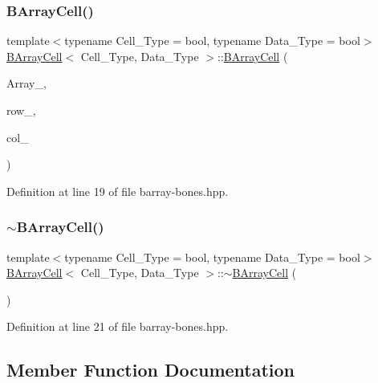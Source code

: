 \subsubsection{\texorpdfstring{B\+Array\+Cell()}{BArrayCell()}}
{\footnotesize\ttfamily template$<$typename Cell\+\_\+\+Type = bool, typename Data\+\_\+\+Type = bool$>$ \\
\hyperlink{class_b_array_cell}{B\+Array\+Cell}$<$ Cell\+\_\+\+Type, Data\+\_\+\+Type $>$\+::\hyperlink{class_b_array_cell}{B\+Array\+Cell} (\begin{DoxyParamCaption}\item[{\hyperlink{class_b_array}{B\+Array}$<$ Cell\+\_\+\+Type, Data\+\_\+\+Type $>$ $\ast$}]{Array\+\_\+,  }\item[{\hyperlink{typedefs_8hpp_a91ad9478d81a7aaf2593e8d9c3d06a14}{uint}}]{row\+\_\+,  }\item[{\hyperlink{typedefs_8hpp_a91ad9478d81a7aaf2593e8d9c3d06a14}{uint}}]{col\+\_\+ }\end{DoxyParamCaption})\hspace{0.3cm}{\ttfamily [inline]}}



Definition at line 19 of file barray-\/bones.\+hpp.

\mbox{\label{class_b_array_cell_a6fbc56424caade490a72685cc35ad0e9}} 
\subsubsection{\texorpdfstring{$\sim$\+B\+Array\+Cell()}{~BArrayCell()}}
{\footnotesize\ttfamily template$<$typename Cell\+\_\+\+Type = bool, typename Data\+\_\+\+Type = bool$>$ \\
\hyperlink{class_b_array_cell}{B\+Array\+Cell}$<$ Cell\+\_\+\+Type, Data\+\_\+\+Type $>$\+::$\sim$\hyperlink{class_b_array_cell}{B\+Array\+Cell} (\begin{DoxyParamCaption}{ }\end{DoxyParamCaption})\hspace{0.3cm}{\ttfamily [inline]}}



Definition at line 21 of file barray-\/bones.\+hpp.



\subsection{Member Function Documentation}
\mbox{\label{class_b_array_cell_a726de4e638ec37b1147d737809765953}} 
